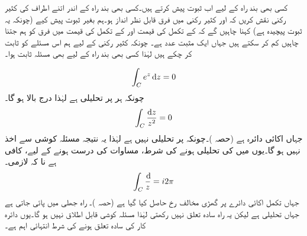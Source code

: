 کسی بھی بند راہ  کے  لیے اب ثبوت پیش کرتے ہیں۔کسی بھی بند راہ کے اندر اتنے اطراف کی کثیر رکنی  نقش کریں کہ  اور کثیر رکنی میں فرق قابل نظر انداز ہو۔ہم بغیر ثبوت پیش کیے (چونکہ یہ ثبوت پیچیدہ ہے) کہنا چاہیں گے کہ   کے تکمل کی قیمت اور  کے تکمل کی قیمت میں فرق   کو ہم جتنا چاہیں کم کر سکتے ہیں جہاں  ایک مثبت عدد ہے۔ چونکہ کثیر رکنی کے لیے ہم اس مسئلے کو ثابت کر چکے ہیں لہٰذا کسی بھی بند راہ کے لیے بھی مسئلہ ثابت ہوا۔ 

\quad
\begin{align*}
\int_C e^z\dif z=0
\end{align*}
چونکہ ہر  پر  تحلیلی ہے لہٰذا درج بالا ہو گا۔
\quad
\begin{align*}
\int_C\frac{\dif z}{z^2}=0
\end{align*}
جہاں  اکائی دائرہ ہے (حصہ )۔چونکہ  پر  تحلیلی نہیں ہے لہٰذا یہ نتیجہ مسئلہ کوشی سے اخذ نہیں ہو گا۔یوں  میں  کی تحلیلی ہونے کی شرط، مساوات  کی درست ہونے کے لیے،  کافی ہے نا کہ لازمی۔
\quad
\begin{align*}
\int_C\frac{\dif }{z}=i2\pi
\end{align*}
جہاں تکمل اکائی دائرے پر گھڑی مخالف  رخ حاصل کیا گیا ہے (حصہ )۔ راہ  جھلی  میں پائی جاتی ہے جہاں  تحلیلی ہے لیکن یہ راہ سادہ تعلق نہیں رکھتی لہٰذا مسئلہ کوشی قابل اطلاق نہیں ہو گا۔یوں دائرہ کار  کی سادہ تعلق ہونے کی شرط انتہائی اہم ہے۔


